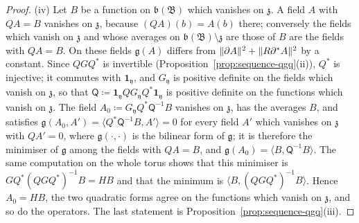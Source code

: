 \documentclass[11pt]{preprint}
\DeclarePairedDelimiter{\norm}{\lVert}{\rVert}
\numberwithin{equation}{section}
\theoremstyle{definition}
\theoremstyle{remark}
\theoremstyle{plain}
\begin{document}
\begin{proof}
(iv) Let $B$ be a function on $\mathfrak b(\mathfrak B)$ which vanishes on $\mathfrak z$. A field $A$ with $QA = B$ vanishes on $\mathfrak z$, because $(QA)(b) = A(b)$ there; conversely the fields which vanish on $\mathfrak z$ and whose averages on $\mathfrak b(\mathfrak B) \setminus \mathfrak z$ are those of $B$ are the fields with $QA = B$. On these fields $\mathfrak g(A)$ differs from $\norm{\partial A}^2 + \norm{R\partial^*A}^2$ by a constant. Since $QGQ^*$ is invertible (Proposition~\ref{prop:sequence-qgq}(ii)), $Q^*$ is injective; it commutes with $\mathbf 1_{\mathfrak y}$, and $G_{\mathfrak y}$ is positive definite on the fields which vanish on $\mathfrak z$, so that $\mathsf Q \coloneqq \mathbf 1_{\mathfrak y}QG_{\mathfrak y}Q^*\mathbf 1_{\mathfrak y}$ is positive definite on the functions which vanish on $\mathfrak z$. The field $A_0 \coloneqq G_{\mathfrak y}Q^*\mathsf Q^{-1}B$ vanishes on $\mathfrak z$, has the averages $B$, and satisfies $\mathfrak g(A_0, A') = \langle Q^*\mathsf Q^{-1}B, A'\rangle = 0$ for every field $A'$ which vanishes on $\mathfrak z$ with $QA' = 0$, where $\mathfrak g(\cdot, \cdot)$ is the bilinear form of $\mathfrak g$; it is therefore the minimiser of $\mathfrak g$ among the fields with $QA = B$, and $\mathfrak g(A_0) = \langle B, \mathsf Q^{-1}B\rangle$. The same computation on the whole torus shows that this minimiser is $GQ^*(QGQ^*)^{-1}B = HB$ and that the minimum is $\langle B, (QGQ^*)^{-1}B\rangle$. Hence $A_0 = HB$, the two quadratic forms agree on the functions which vanish on $\mathfrak z$, and so do the operators. The last statement is Proposition~\ref{prop:sequence-qgq}(iii).


\end{proof}
\end{document}
